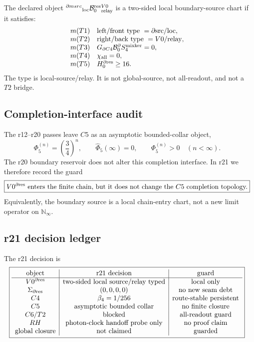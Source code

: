 \begin{definition}
\label{def:v470-r21-two-sided-boundary-source-type}
The declared object \(
{}^{\partial{
m src}}{}_{\rm loc}\mathcal B_0^{\rm res}{}^{V0}_{\rm relay}
\)
is a two-sided local boundary-source chart if it satisfies:
\[
\begin{array}{ll}
{
m (T1)} & \text{left/front type }=\partial{\rm src}/\rm loc,\\
{
m (T2)} & \text{right/back type }=V0/\rm relay,\\
{
m (T3)} & G_{\partial C4}\mathcal B_{0}^{\partial}S_{4}^{\rm mixker}=0,\\
{
m (T4)} & \chi_{\rm all}=0,\\
{
m (T5)} & H_0^{\partial{\rm res}}\ge16.
\end{array}
\]
The type is local-source/relay.  It is not global-source, not all-readout, and
not a \(T2\) bridge.
\end{definition}

\subsection{Completion-interface audit}
\label{subsec:v470-r21-completion-interface-audit}

The r12--r20 passes leave \(C5\) as an asymptotic bounded-collar object,
\[
\Phi_5^{(n)}=\left(\frac34\right)^n,
\qquad
\widehat{\Phi}_5(\infty)=0,
\qquad
\Phi_5^{(n)}>0\quad(n<\infty).
\]
The r20 boundary reservoir does not alter this completion interface.  In r21 we
therefore record the guard
\[
\boxed{
V0^{\partial{\rm res}}\text{ enters the finite chain, but it does not change the }
C5\text{ completion topology.}
}
\]
Equivalently, the boundary source is a local chain-entry chart, not a new limit
operator on \(\mathbb N_\infty\).

\subsection{r21 decision ledger}
\label{subsec:v470-r21-decision-ledger}

The r21 decision is
\[
\boxed{
\begin{array}{c|c|c}
\text{object} & \text{r21 decision} & \text{guard}\\
\hline
V0^{\partial{\rm res}} & \text{two-sided local source/relay typed} & \text{local only}\\
\Sigma_{\partial{\rm res}} & (0,0,0,0) & \text{no new seam debt}\\
C4 & \beta_4=1/256 & \text{route-stable persistent}\\
C5 & \text{asymptotic bounded collar} & \text{no finite closure}\\
C6/T2 & \text{blocked} & \text{all-readout guard}\\
RH & \text{photon-clock handoff probe only} & \text{no proof claim}\\
\text{global closure} & \text{not claimed} & \text{guarded}
\end{array}
}
\]


